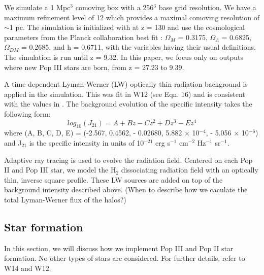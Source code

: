 \documentclass[a4paper,fleqn,usenatbib]{mnras}
\begin{document}
We simulate a 1 Mpc$^{3}$ comoving box with a 256$^{3}$ base grid 
resolution. We have a maximum refinement level of 12 which provides a maximal comoving resolution of $\sim$1 pc. The simulation is 
initialized with \music{} \citep{Hahn11_MUSIC} at z = 130 and use the cosmological parameters from the Planck collaboration best fit 
\citet{Planck13_Cosmo}: $\Omega_{M}$ = 0.3175, $\Omega_{\Lambda}$ = 
0.6825, $\Omega_{DM}$ = 0.2685, and h = 0.6711, with the variables 
having their usual definitions. The simulation is run until z = 9.32. In this paper, we focus only on outputs where new Pop III stars are born, from z = 27.23 to 9.39. 

A time-dependent Lyman-Werner (LW) optically thin radiation background is applied in the simulation. This was fit in W12 (see Eqn. 16) and is consistent with the values in \citet{Trenti09_SFR}. The background evolution of the specific intensity takes the following form:
\begin{equation}
	log_{10}(J_{21}) = A + Bz - Cz^{2} + Dz^{3} - Ez^{4}
\end{equation}
where (A, B, C, D, E) = (-2.567, 0.4562, - 0.02680, 5.882 $\times$ 10$^{-4}$, - 5.056 $\times$ 10$^{-6}$) and J$_{21}$ is the specific intensity in units of 10$^{-21}$ erg s$^{-1}$ cm$^{-2}$ Hz$^{-1}$ sr$^{-1}$. 

Adaptive ray tracing \citep{Abel02_RT, Wise11_Moray} is used to evolve the radiation field. Centered on each Pop II and Pop III star, we model the H$_{2}$ dissociating radiation field with an optically thin, inverse square profile. These LW sources are added on top of the background intensity described above. (When to describe how we caculate the total Lyman-Werner flux of the halos?)
\subsection{Star formation}
In this section, we will discuss how we implement Pop III and Pop II 
star formation. No other types of stars are considered. For further 
details, refer to W14 and W12. 

\end{document}
